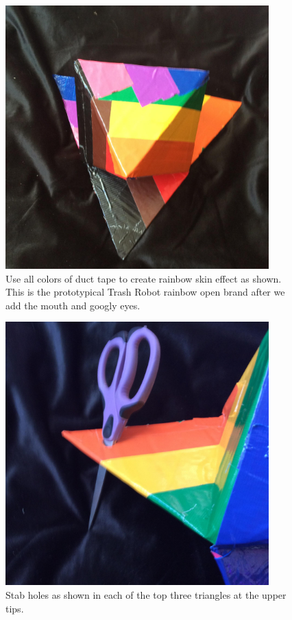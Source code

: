 \begin{figure}
	\centering
	\includegraphics[width=4in]{figures/artboxrainbowskin.jpg}
	\caption[artboxrainbowskin]
	{Use all colors of duct tape to create rainbow skin effect as shown. This is the prototypical Trash Robot rainbow open brand after we add the mouth and googly eyes.} 
\end{figure}

\begin{figure}
	\centering
	\includegraphics[width=4in]{figures/artboxhole.jpg}
	\caption[artboxhole]
	{Stab holes as shown in each of the top three triangles at the upper tips.}
\end{figure}

